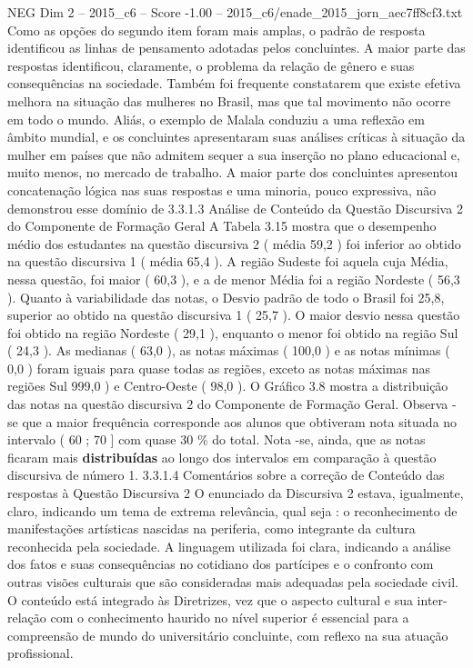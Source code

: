 \begin{textsample}{NEG Dim 2 – 2015\_c6 – Score -1.00 – 2015\_c6/enade\_2015\_jorn\_aec7ff8cf3.txt}
Como as opções do segundo item foram mais amplas, o padrão de resposta identificou as linhas de pensamento adotadas pelos concluintes.
A maior parte das respostas identificou, claramente, o problema da relação de gênero e suas consequências na sociedade.
Também foi frequente constatarem que existe efetiva melhora na situação das mulheres no Brasil, mas que tal movimento não ocorre em todo o mundo.
Aliás, o exemplo de Malala conduziu a uma reflexão em âmbito mundial, e os concluintes apresentaram suas análises críticas à situação da mulher em países que não admitem sequer a sua inserção no plano educacional e, muito menos, no mercado de trabalho.
A maior parte dos concluintes apresentou concatenação lógica nas suas respostas e uma minoria, pouco expressiva, não demonstrou esse domínio de 3.3.1.3 Análise de Conteúdo da Questão Discursiva 2 do Componente de Formação Geral A Tabela 3.15 mostra que o desempenho médio dos estudantes na questão discursiva 2 ( média 59,2 ) foi inferior ao obtido na questão discursiva 1 ( média 65,4 ).
A região Sudeste foi aquela cuja Média, nessa questão, foi maior ( 60,3 ), e a de menor Média foi a região Nordeste ( 56,3 ).
Quanto à variabilidade das notas, o Desvio padrão de todo o Brasil foi 25,8, superior ao obtido na questão discursiva 1 ( 25,7 ).
O maior desvio nessa questão foi obtido na região Nordeste ( 29,1 ), enquanto o menor foi obtido na região Sul ( 24,3 ).
As medianas ( 63,0 ), as notas máximas ( 100,0 ) e as notas mínimas ( 0,0 ) foram iguais para quase todas as regiões, exceto as notas máximas nas regiões Sul 999,0 ) e Centro-Oeste ( 98,0 ).
O Gráfico 3.8 mostra a distribuição das notas na questão discursiva 2 do Componente de Formação Geral.
Observa -se que a maior frequência corresponde aos alunos que obtiveram nota situada no intervalo ( 60 ; 70 ] com quase 30 \% do total.
Nota -se, ainda, que as notas ficaram mais \textbf{distribuídas} ao longo dos intervalos em comparação à questão discursiva de número 1. 3.3.1.4 Comentários sobre a correção de Conteúdo das respostas à Questão Discursiva 2 O enunciado da Discursiva 2 estava, igualmente, claro, indicando um tema de extrema relevância, qual seja : o reconhecimento de manifestações artísticas nascidas na periferia, como integrante da cultura reconhecida pela sociedade.
A linguagem utilizada foi clara, indicando a análise dos fatos e suas consequências no cotidiano dos partícipes e o confronto com outras visões culturais que são consideradas mais adequadas pela sociedade civil.
O conteúdo está integrado às Diretrizes, vez que o aspecto cultural e sua inter-relação com o conhecimento haurido no nível superior é essencial para a compreensão de mundo do universitário concluinte, com reflexo na sua atuação profissional.

\end{textsample}
